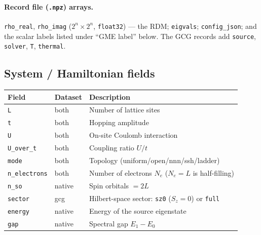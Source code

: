 \documentclass[11pt]{article}
\newcommand{\code}[1]{\texttt{\small #1}}
\begin{document}
\paragraph{Record file (\code{.npz}) arrays.}
\code{rho\_real}, \code{rho\_imag} ($2^n\times2^n$, \code{float32}) --- the RDM;
\code{eigvals}; \code{config\_json}; and the scalar labels listed under
``GME label'' below. The GCG records add \code{source}, \code{solver},
\code{T}, \code{thermal}.

\subsection{System / Hamiltonian fields}
\begin{longtable}{@{}p{2.4cm}p{1.6cm}p{9.3cm}@{}}
\toprule
Field & Dataset & Description \\ \midrule \endhead
\code{L}            & both   & Number of lattice sites \\
\code{t}            & both   & Hopping amplitude \\
\code{U}            & both   & On-site Coulomb interaction \\
\code{U\_over\_t}   & both   & Coupling ratio $U/t$ \\
\code{mode}         & both   & Topology (uniform/open/nnn/ssh/ladder) \\
\code{n\_electrons} & both   & Number of electrons $N_e$ ($N_e{=}L$ is half-filling) \\
\code{n\_so}        & native & Spin orbitals $=2L$ \\
\code{sector}       & gcg    & Hilbert-space sector: \code{sz0} ($S_z{=}0$) or \code{full} \\
\code{energy}       & native & Energy of the source eigenstate \\
\code{gap}          & native & Spectral gap $E_1-E_0$ \\
\bottomrule
\end{longtable}
\end{document}
